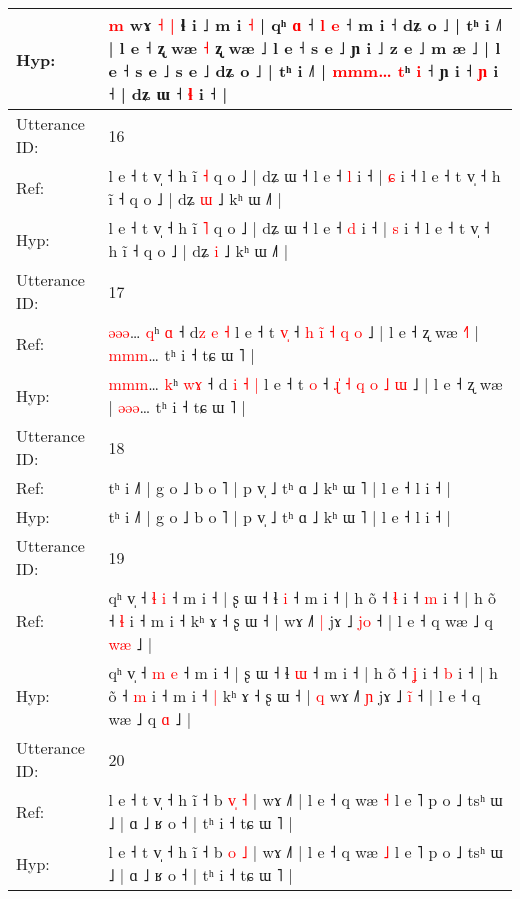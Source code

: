 \documentclass[10pt]{article}
\DeclareRobustCommand{\hl}[1]{{\textcolor{red}{#1}}}
\begin{document}
\begin{longtable}{ll}
 \\
Hyp: & \hl{m} wɤ\hl{ }\hl{˧} \hl{|} ɬ i ˩ m i \hl{}\hl{˧} | qʰ \hl{}\hl{ɑ} ˧ \hl{l} \hl{e} ˧ m i ˧ dʑ o ˩ | tʰ i ˩˥ | l e ˧ ʐ wæ \hl{˧} ʐ wæ ˩\hl{}\hl{} l e ˧ s e ˩ ɲ i ˩ z e ˩ m æ ˩ | l e ˧ s e ˩ s e ˩ dʑ o ˩ | tʰ i ˩˥ | \hl{m}\hl{m}\hl{m}\hl{…}\hl{ }\hl{t}ʰ \hl{i} ˧ ɲ i ˧ \hl{ɲ} i ˧\hl{} | dʑ ɯ ˧ \hl{ɬ} i ˧ |
 \\
\midrule
Utterance ID: & 16 \\
Ref: & l e ˧ t v̩ ˧ h ĩ \hl{˧} q o ˩ | dʑ ɯ ˧ l e ˧ \hl{l} i ˧ | \hl{ɕ} i ˧ l e ˧ t v̩ ˧ h ĩ ˧ q o ˩ | dʑ \hl{ɯ} ˩ kʰ ɯ ˩˥ |
 \\
Hyp: & l e ˧ t v̩ ˧ h ĩ \hl{˥} q o ˩ | dʑ ɯ ˧ l e ˧ \hl{d} i ˧ | \hl{s} i ˧ l e ˧ t v̩ ˧ h ĩ ˧ q o ˩ | dʑ \hl{i} ˩ kʰ ɯ ˩˥ |
 \\
\midrule
Utterance ID: & 17 \\
Ref: & \hl{ə}\hl{ə}\hl{ə}… \hl{q}ʰ \hl{}\hl{ɑ} ˧ d\hl{}\hl{z} \hl{e} \hl{˧} l e ˧ t \hl{v}\hl{̩} ˧ \hl{}\hl{h} \hl{}\hl{i}\hl{̃} \hl{˧} \hl{q} \hl{o} ˩ | l e ˧ ʐ wæ\hl{ }\hl{˧}\hl{˥} | \hl{m}\hl{m}\hl{m}… tʰ i ˧ tɕ ɯ ˥ |
 \\
Hyp: & \hl{m}\hl{m}\hl{m}… \hl{k}ʰ \hl{w}\hl{ɤ} ˧ d\hl{ }\hl{i} \hl{˧} \hl{|} l e ˧ t \hl{}\hl{o} ˧ \hl{ɻ}\hl{̍} \hl{˧}\hl{ }\hl{q} \hl{o} \hl{˩} \hl{ɯ} ˩ | l e ˧ ʐ wæ\hl{}\hl{}\hl{} | \hl{ə}\hl{ə}\hl{ə}… tʰ i ˧ tɕ ɯ ˥ |
 \\
\midrule
Utterance ID: & 18 \\
Ref: & tʰ i ˩˥ | g o ˩ b o ˥ | p v̩ ˩ tʰ ɑ ˩ kʰ ɯ ˥ | l e ˧ l i ˧ |
 \\
Hyp: & tʰ i ˩˥ | g o ˩ b o ˥ | p v̩ ˩ tʰ ɑ ˩ kʰ ɯ ˥ | l e ˧ l i ˧ |
 \\
\midrule
Utterance ID: & 19 \\
Ref: & qʰ v̩ ˧ \hl{ɬ} \hl{i} ˧ m i ˧ | ʂ ɯ ˧ ɬ \hl{i} ˧ m i ˧ | h õ ˧ \hl{ɬ} i ˧ \hl{m} i ˧ | h õ ˧ \hl{ɬ} i ˧ m i ˧\hl{}\hl{} kʰ ɤ ˧ ʂ ɯ ˧ |\hl{}\hl{} wɤ ˩˥ \hl{|} jɤ ˩ \hl{j}\hl{o} ˧ | l e ˧ q wæ ˩ q \hl{w}\hl{æ} ˩ |
 \\
Hyp: & qʰ v̩ ˧ \hl{m} \hl{e} ˧ m i ˧ | ʂ ɯ ˧ ɬ \hl{ɯ} ˧ m i ˧ | h õ ˧ \hl{ʝ} i ˧ \hl{b} i ˧ | h õ ˧ \hl{m} i ˧ m i ˧\hl{ }\hl{|} kʰ ɤ ˧ ʂ ɯ ˧ |\hl{ }\hl{q} wɤ ˩˥ \hl{ɲ} jɤ ˩ \hl{i}\hl{̃} ˧ | l e ˧ q wæ ˩ q \hl{}\hl{ɑ} ˩ |
 \\
\midrule
Utterance ID: & 20 \\
Ref: & l e ˧ t v̩ ˧ h ĩ ˧ b \hl{v}\hl{̩} \hl{˧} | wɤ ˩˥ | l e ˧ q wæ \hl{˧} l e ˥ p o ˩ tsʰ ɯ ˩ | ɑ ˩ ʁ o ˧ | tʰ i ˧ tɕ ɯ ˥ |
 \\
Hyp: & l e ˧ t v̩ ˧ h ĩ ˧ b \hl{}\hl{o} \hl{˩} | wɤ ˩˥ | l e ˧ q wæ \hl{˩} l e ˥ p o ˩ tsʰ ɯ ˩ | ɑ ˩ ʁ o ˧ | tʰ i ˧ tɕ ɯ ˥ |

\end{longtable}
\end{document}
